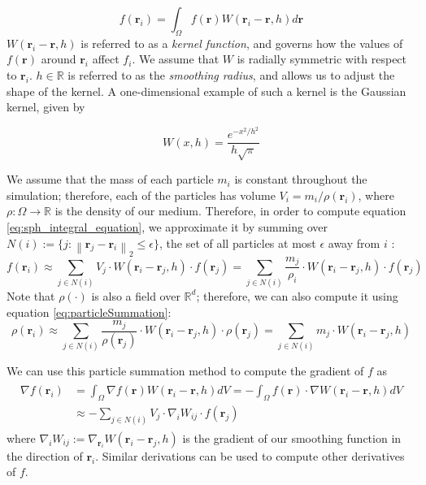 \begin{equation} \label{eq:sph_integral_equation}
    f(\textbf{r}_i) = \int_{\Omega} f(\textbf{r}) W( \textbf{r}_i - \textbf{r}, h) d\textbf{r} 
\end{equation}
$W(\textbf{r}_i - \textbf{r}, h)$ is referred to as a \textit{kernel function}, and governs how the values of $f(\textbf{r})$ around $\textbf{r}_i$ affect $f_i$. We assume that $W$ is radially symmetric with respect to $\textbf{r}_i$. $h \in \mathbb{R}$ is referred to as the \textit{smoothing radius}, and allows us to adjust the shape of the kernel. A one-dimensional example of such a kernel is the Gaussian kernel, given by

\begin{equation}
    W(x, h) = \frac{e^{-x^2 / h^2}}{h \sqrt{\pi}}
\end{equation}

\newcommand{\norm}[1]{\left\lVert#1\right\rVert}

We assume that the mass of each particle $m_i$ is constant throughout the simulation; therefore, each of the particles has volume $V_i = m_i / \rho(\textbf{r}_i)$, where $\rho : \Omega \rightarrow \mathbb{R}$ is the density of our medium. Therefore, in order to compute equation \eqref{eq:sph_integral_equation}, we approximate it by summing over $N(i) := \{j : \norm{\textbf{r}_j - \textbf{r}_i}_2 \leq \epsilon\}$, the set of all particles at most $\epsilon$ away from $i$ \cite{zhang2021sphinxsys}:
\begin{equation} \label{eq:particleSummation}
    f(\textbf{r}_i) \approx \sum_{j \in N(i)} V_j  \cdot W(\textbf{r}_i - \textbf{r}_j, h) \cdot f(\textbf{r}_j) = \sum_{j \in N(i)} \frac{m_j}{\rho_i} \cdot W(\textbf{r}_i - \textbf{r}_j, h) \cdot f(\textbf{r}_j)
\end{equation}
Note that $\rho(\cdot)$ is also a field over $\mathbb{R}^d$; therefore, we can also compute it using equation \eqref{eq:particleSummation}:
\begin{equation}
    \rho(\textbf{r}_i) \approx \sum_{j \in N(i)} \frac{m_j}{\rho(\textbf{r}_j)} \cdot W(\textbf{r}_i - \textbf{r}_j, h) \cdot \rho(\textbf{r}_j) = \sum_{j \in N(i)} m_j \cdot W(\textbf{r}_i - \textbf{r}_j, h)
\end{equation}

We can use this particle summation method to compute the gradient of $f$ as
\begin{align}
\begin{split}
    \nabla f(\textbf{r}_i) &= \int_{\Omega} \nabla f(\textbf{r}) W(\textbf{r}_i - \textbf{r}, h) dV = - \int_{\Omega} f(\textbf{r}) \cdot \nabla W(\textbf{r}_i - \textbf{r}, h) dV\\
    &\approx - \sum_{j \in N(i)} V_j \cdot \nabla_i W_{ij} \cdot f(\textbf{r}_j)
\end{split}
\end{align}
where $\nabla_i W_{ij} := \nabla_{\textbf{r}_i} W(\textbf{r}_i - \textbf{r}_j, h)$ is the gradient of our smoothing function in the direction of $\textbf{r}_i$. Similar derivations can be used to compute other derivatives of $f$. 

